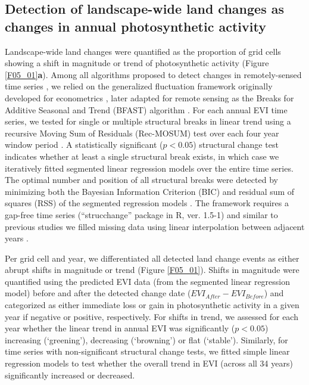 \subsection{Detection of landscape-wide land changes as changes in annual photosynthetic activity}
\label{C05_0203}

Landscape-wide land changes were quantified as the proportion of grid cells showing a shift in magnitude or trend of photosynthetic activity (Figure \ref{F05_01}\textbf{a}). Among all algorithms proposed to detect changes in remotely-sensed time series \citep{Zhu2017}, we relied on the generalized fluctuation framework originally developed for econometrics \citep{Bai2003,Zeileis2005}, later adapted for remote sensing as the Breaks for Additive Seasonal and Trend (BFAST) algorithm \citep{Verbesselt2010}. For each annual EVI time series, we tested for single or multiple structural breaks in linear trend using a recursive Moving Sum of Residuals (Rec-MOSUM) test over each four year window period \citep{Zeileis2005}. A statistically significant ($p < 0.05$) structural change test indicates whether at least a single structural break exists, in which case we iteratively fitted segmented linear regression models over the entire time series. The optimal number and position of all structural breaks were detected by minimizing both the Bayesian Information Criterion (BIC) and residual sum of squares (RSS) of the segmented regression models \citep{Zeileis2005,Verbesselt2010}. The framework requires a gap-free time series (“strucchange” package in R, ver. 1.5-1) and similar to previous studies we filled missing data using linear interpolation between adjacent years \citep{Verbesselt2010}.

Per grid cell and year, we differentiated all detected land change events as either abrupt shifts in magnitude or trend (Figure \ref{F05_01}). Shifts in magnitude were quantified using the predicted EVI data (from the segmented linear regression model) before and after the detected change date ($EVI_{After} - EVI_{Before}$) and categorized as either immediate loss or gain in photosynthetic activity in a given year if negative or positive, respectively. For shifts in trend, we assessed for each year whether the linear trend in annual EVI was significantly ($p < 0.05$) increasing (‘greening’), decreasing (‘browning’) or flat (‘stable’). Similarly, for time series with non-significant structural change tests, we fitted simple linear regression models to test whether the overall trend in EVI (across all 34 years) significantly increased or decreased.

